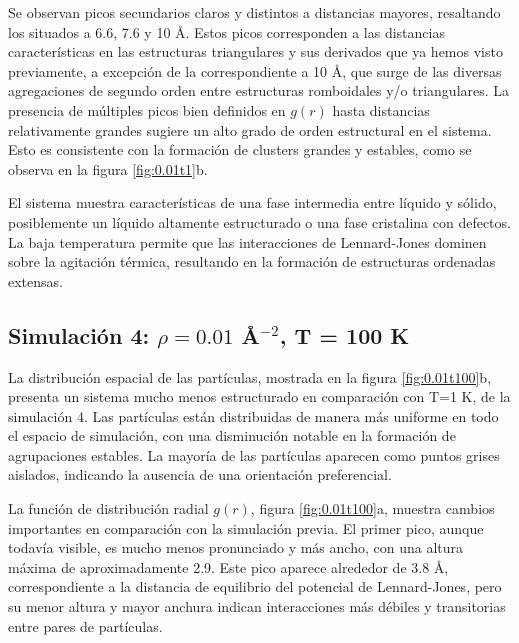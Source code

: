 Se observan picos secundarios claros y distintos a distancias mayores, resaltando los situados a 6.6, 7.6 y 10 \AA. Estos picos corresponden a las distancias características en las estructuras triangulares y sus derivados que ya hemos visto previamente, a excepción de la correspondiente a 10 \AA, que surge de las diversas agregaciones de segundo orden entre estructuras romboidales y/o triangulares. La presencia de múltiples picos bien definidos en $g(r)$ hasta distancias relativamente grandes sugiere un alto grado de orden estructural en el sistema. Esto es consistente con la formación de clusters grandes y estables, como se observa en la figura \ref{fig:0.01t1}b.

\vspace{\baselineskip}

El sistema muestra características de una fase intermedia entre líquido y sólido, posiblemente un líquido altamente estructurado o una fase cristalina con defectos. La baja temperatura permite que las interacciones de Lennard-Jones dominen sobre la agitación térmica, resultando en la formación de estructuras ordenadas extensas.






\subsection{Simulación 4: $\rho = 0.01$ \AA$^{-2}$, T = 100 K}

La distribución espacial de las partículas, mostrada en la figura \ref{fig:0.01t100}b, presenta un sistema mucho menos estructurado en comparación con T=1 K, de la simulación 4. Las partículas están distribuidas de manera más uniforme en todo el espacio de simulación, con una disminución notable en la formación de agrupaciones estables. La mayoría de las partículas aparecen como puntos grises aislados, indicando la ausencia de una orientación preferencial.

\vspace{\baselineskip}

La función de distribución radial $g(r)$, figura \ref{fig:0.01t100}a, muestra cambios importantes en comparación con la simulación previa. El primer pico, aunque todavía visible, es mucho menos pronunciado y más ancho, con una altura máxima de aproximadamente 2.9. Este pico aparece alrededor de 3.8 \AA, correspondiente a la distancia de equilibrio del potencial de Lennard-Jones, pero su menor altura y mayor anchura indican interacciones más débiles y transitorias entre pares de partículas.  

